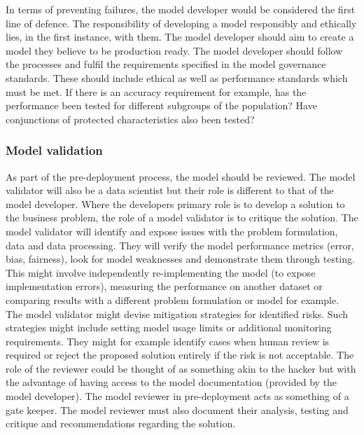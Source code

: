 In terms of preventing failures, the model developer would be considered the first line of defence. The responsibility of developing a model responsibly and ethically lies, in the first instance, with them. The model developer should aim to create a model they believe to be production ready. The model developer should follow the processes and fulfil the requirements specified in the model governance standards. These should include ethical as well as performance standards which must be met. If there is an accuracy requirement for example, has the performance been tested for different subgroups of the population? Have conjunctions of protected characteristics also been tested?

\subsubsection*{Model validation}

As part of the pre-deployment process, the model should be reviewed. The model validator will also be a data scientist but their role is different to that of the model developer. Where the developers primary role is to develop a solution to the business problem, the role of a model validator is to critique the solution. The model validator will identify and expose issues with the problem formulation, data and data processing. They will verify the model performance metrics (error, bias, fairness), look for model weaknesses and demonstrate them through testing. This might involve independently re-implementing the model (to expose implementation errors), measuring the performance on another dataset or comparing results with a different problem formulation or model for example. The model validator might devise mitigation strategies for identified risks. Such strategies might include setting model usage limits or additional monitoring requirements. They might for example identify cases when human review is required or reject the proposed solution entirely if the risk is not acceptable. The role of the reviewer could be thought of as something akin to the hacker but with the advantage of having access to the model documentation (provided by the model developer). The model reviewer in pre-deployment acts as something of a gate keeper. The model reviewer must also document their analysis, testing and critique and recommendations regarding the solution.

